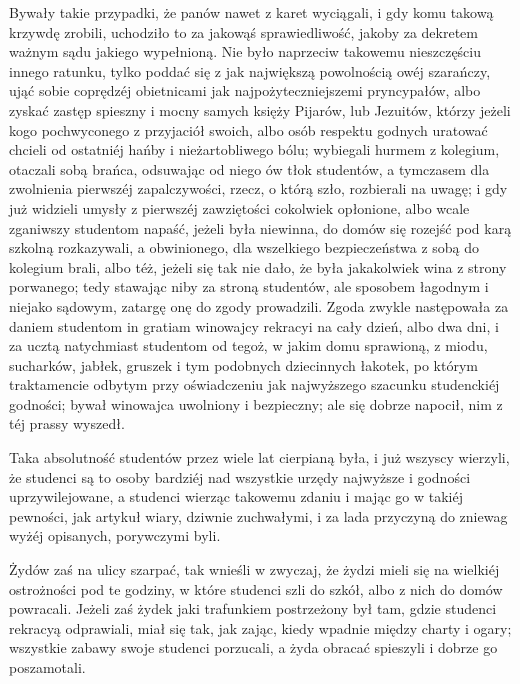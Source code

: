 \documentclass{book}
\begin{document}
Bywały takie przypadki, że panów nawet z karet wyciągali, i gdy komu takową krzywdę zrobili, uchodziło to za jakowąś sprawiedliwość, jakoby za dekretem ważnym sądu jakiego wypełnioną. Nie było naprzeciw takowemu nieszczęściu innego ratunku, tylko poddać się z jak największą powolnością owéj szarańczy, ująć sobie coprędzéj obietnicami jak najpożyteczniejszemi pryncypałów, albo zyskać zastęp spieszny i mocny samych księży Pijarów, lub Jezuitów, którzy jeżeli kogo pochwyconego z przyjaciół swoich, albo osób respektu godnych uratować chcieli od ostatniéj hańby i nieżartobliwego bólu; wybiegali hurmem z kolegium, otaczali sobą brańca, odsuwając od niego ów tłok studentów, a tymczasem dla zwolnienia pierwszéj zapalczywości, rzecz, o którą szło, rozbierali na uwagę; i gdy już widzieli umysły z pierwszéj zawziętości cokolwiek opłonione, albo wcale zganiwszy studentom napaść, jeżeli była niewinna, do domów się rozejść pod karą szkolną rozkazywali, a obwinionego, dla wszelkiego bezpieczeństwa z sobą do kolegium brali, albo téż, jeżeli się tak nie dało, że była jakakolwiek wina z strony porwanego; tedy stawając niby za stroną studentów, ale sposobem łagodnym i niejako sądowym, zatargę onę do zgody prowadzili. Zgoda zwykle następowała za daniem studentom in gratiam winowajcy rekracyi na cały dzień, albo dwa dni, i za ucztą natychmiast studentom od tegoż, w jakim domu sprawioną, z miodu, sucharków, jabłek, gruszek i tym podobnych dziecinnych łakotek, po którym traktamencie odbytym przy oświadczeniu jak najwyższego szacunku studenckiéj godności; bywał winowajca uwolniony i bezpieczny; ale się dobrze napocił, nim z téj prassy wyszedł.

Taka absolutność studentów przez wiele lat cierpianą była, i już wszyscy wierzyli, że studenci są to osoby bardziéj nad wszystkie urzędy najwyższe i godności uprzywilejowane, a studenci wierząc takowemu zdaniu i mając go w takiéj pewności, jak artykuł wiary, dziwnie zuchwałymi, i za lada przyczyną do zniewag wyżéj opisanych, porywczymi byli.

Żydów zaś na ulicy szarpać, tak wnieśli w zwyczaj, że żydzi mieli się na wielkiéj ostrożności pod te godziny, w które studenci szli do szkół, albo z nich do domów powracali. Jeżeli zaś żydek jaki trafunkiem postrzeżony był tam, gdzie studenci rekracyą odprawiali, miał się tak, jak zając, kiedy wpadnie między charty i ogary; wszystkie zabawy swoje studenci porzucali, a żyda obracać spieszyli i dobrze go poszamotali.
\end{document}
